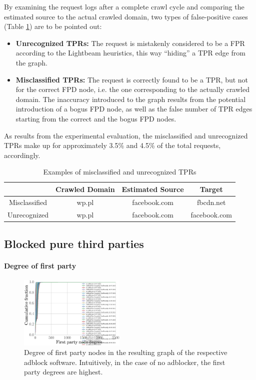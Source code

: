 \documentclass{sig-alternate}
\begin{document}
By examining the request logs after a complete crawl cycle and comparing the estimated source to the actual crawled domain, two types of false-positive cases (Table \ref{table:false_positive_examples}) are to be pointed out:

\begin{itemize}
\item \textbf{Unrecognized TPRs:} The request is mistakenly considered to be a FPR according to the Lightbeam heuristics, this way ``hiding'' a TPR edge from the graph.
\item \textbf{Misclassified TPRs:} The request is correctly found to be a TPR, but not for the correct FPD node, i.e. the one corresponding to the actually crawled domain. The inaccuracy introduced to the graph results from the potential introduction of a bogus FPD node, as well as the false number of TPR edges starting from the correct and the bogus FPD nodes.
\end{itemize}

As results from the experimental evaluation, the misclassified and unrecognized TPRs make up for approximately 3.5\% and 4.5\% of the total requests, accordingly.

\begin{table}
\centering
\small
\begin{tabular}{|c|c c c|}
\hline
& Crawled Domain & Estimated Source & Target \\
\hline
Misclassified & wp.pl & facebook.com & fbcdn.net \\
Unrecognized & wp.pl & facebook.com & facebook.com \\
\hline
\end{tabular}
\label{table:false_positive_examples}
\caption{Examples of misclassified and unrecognized TPRs}
\end{table}

\subsection{Blocked pure third parties}

\paragraph{Degree of first party}
\begin{figure}[h]
  \centering
  \includegraphics[width=0.45\textwidth]{figures/degree_first_parties.eps}
  \caption{Degree of first party nodes in the resulting graph of the respective adblock software. Intuitively, in the case of no adblocker, the first party degrees are highest.}\label{fig:degree_first_parties}
\end{figure}
\end{document}
